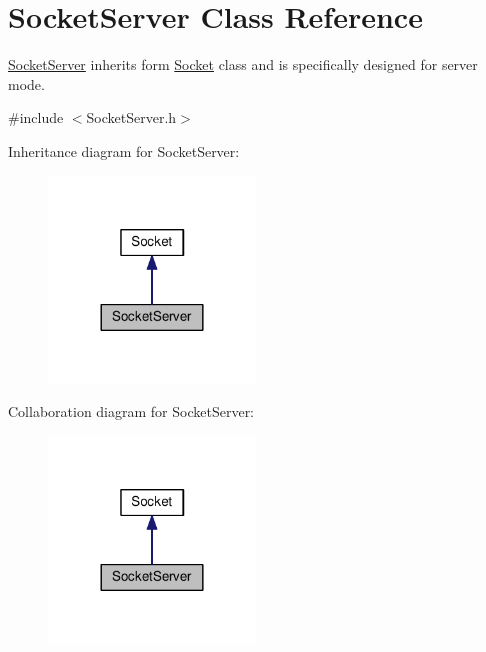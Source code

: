 \hypertarget{classSocketServer}{}\section{Socket\+Server Class Reference}
\label{classSocketServer}


\textquotesingle{}\hyperlink{classSocketServer}{Socket\+Server}\textquotesingle{} inherits form \textquotesingle{}\hyperlink{classSocket}{Socket}\textquotesingle{} class and is specifically designed for server mode.  




{\ttfamily \#include $<$Socket\+Server.\+h$>$}



Inheritance diagram for Socket\+Server\+:
\nopagebreak
\begin{figure}[H]
\begin{center}
\leavevmode
\includegraphics[width=156pt]{classSocketServer__inherit__graph}
\end{center}
\end{figure}


Collaboration diagram for Socket\+Server\+:
\nopagebreak
\begin{figure}[H]
\begin{center}
\leavevmode
\includegraphics[width=156pt]{classSocketServer__coll__graph}
\end{center}
\end{figure}
